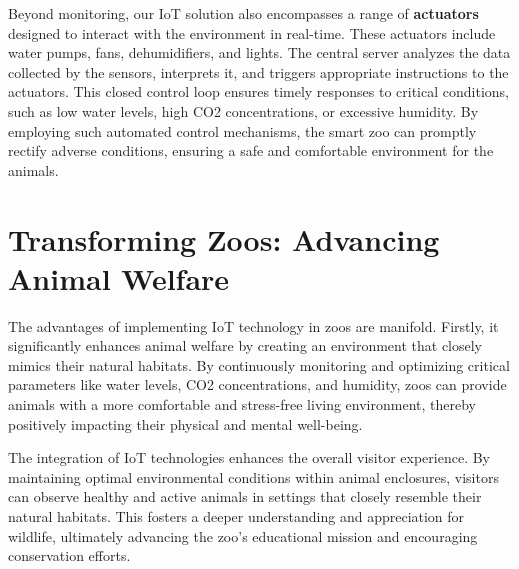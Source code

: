 \documentclass[parskip=full]{report}
\begin{document}
Beyond monitoring, our IoT solution also encompasses a range of \textbf{actuators} designed to interact with the environment in real-time. These actuators include water pumps, fans, dehumidifiers, and lights. The central server analyzes the data collected by the sensors, interprets it, and triggers appropriate instructions to the actuators. This closed control loop ensures timely responses to critical conditions, such as low water levels, high CO2 concentrations, or excessive humidity. By employing such automated control mechanisms, the smart zoo can promptly rectify adverse conditions, ensuring a safe and comfortable environment for the animals.
\section{Transforming Zoos: Advancing Animal Welfare}

The advantages of implementing IoT technology in zoos are manifold. Firstly, it significantly enhances animal welfare by creating an environment that closely mimics their natural habitats. By continuously monitoring and optimizing critical parameters like water levels, CO2 concentrations, and humidity, zoos can provide animals with a more comfortable and stress-free living environment, thereby positively impacting their physical and mental well-being.


The integration of IoT technologies enhances the overall visitor experience. By maintaining optimal environmental conditions within animal enclosures, visitors can observe healthy and active animals in settings that closely resemble their natural habitats. This fosters a deeper understanding and appreciation for wildlife, ultimately advancing the zoo's educational mission and encouraging conservation efforts.

\end{document}
